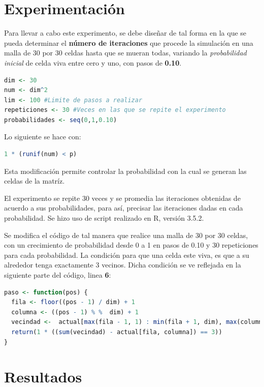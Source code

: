 \documentclass{article}
\begin{document}
\section{Experimentaci\'on}

Para llevar a cabo este experimento, se debe dise\~nar de tal forma en la que se pueda determinar el \textbf{n\'umero de iteraciones} que procede la simulaci\'on en una malla de 30 por 30 celdas hasta que se mueran todas, variando la \textit{probabilidad inicial} de celda viva entre cero y uno, con pasos de \textbf{0.10}. 

\newpage

\begin{lstlisting}[language=R]
dim <- 30
num <- dim^2
lim <- 100 #Limite de pasos a realizar
repeticiones <- 30 #Veces en las que se repite el experimento
probabilidades <- seq(0,1,0.10)
\end{lstlisting}
Lo siguiente se hace con:

\begin{lstlisting}[language=R]
1 * (runif(num) < p)
\end{lstlisting}

Esta modificaci\'on permite controlar la probabilidad con la cual se generan las celdas de la matr\'iz.

El experimento se repite 30 veces y se promedia las iteraciones obtenidas de acuerdo a sus probabilidades, para as\'i, precisar las iteraciones dadas en cada probabilidad. Se hizo uso de script realizado en R, versi\'on 3.5.2.

Se modifica el c\'odigo de tal manera que realice una malla de 30 por 30 celdas, con un crecimiento de probabilidad desde 0 a 1 en pasos de 0.10 y 30 repeticiones para cada probabilidad. La condici\'on para que una celda este viva, es que a su alrededor tenga exactamente 3 vecinos. Dicha condici\'on se ve reflejada en la siguiente parte del c\'odigo, linea \textbf{6}:

\begin{lstlisting}[language=R]
paso <- function(pos) {
  fila <- floor((pos - 1) / dim) + 1
  columna <- ((pos - 1) % %  dim) + 1
  vecindad <-  actual[max(fila - 1, 1) : min(fila + 1, dim), max(columna - 1, 1): min(columna + 1, dim)]
  return(1 * ((sum(vecindad) - actual[fila, columna]) == 3))
}
\end{lstlisting}

\section{Resultados}
\end{document}
